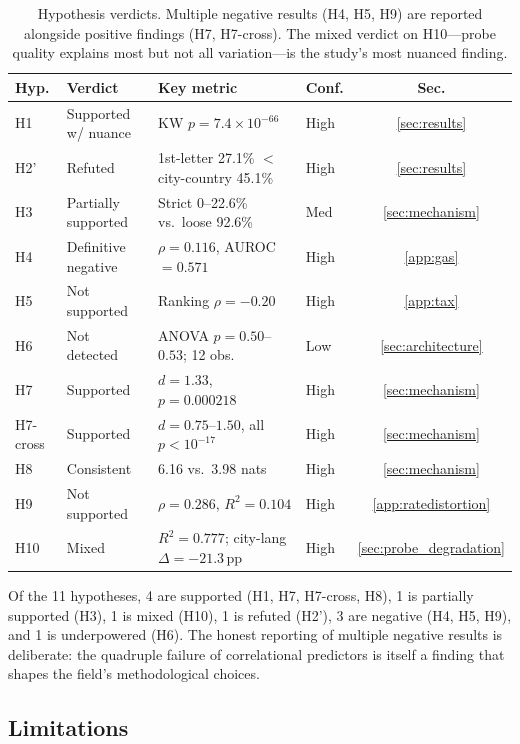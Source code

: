 \documentclass{article}
\begin{document}
\begin{table}[t]
\caption{Hypothesis verdicts. Multiple negative results (H4, H5, H9) are reported alongside positive findings (H7, H7-cross). The mixed verdict on H10---probe quality explains most but not all variation---is the study's most nuanced finding.}
\label{tab:verdicts}
\centering
\small
\begin{tabular}{llllc}
\toprule
Hyp. & Verdict & Key metric & Conf. & Sec. \\
\midrule
H1 & Supported w/ nuance & KW $p = 7.4 \times 10^{-66}$ & High & \ref{sec:results} \\
H2' & Refuted & 1st-letter 27.1\% $<$ city-country 45.1\% & High & \ref{sec:results} \\
H3 & Partially supported & Strict 0--22.6\% vs.\ loose 92.6\% & Med & \ref{sec:mechanism} \\
H4 & Definitive negative & $\rho = 0.116$, AUROC~$= 0.571$ & High & \ref{app:gas} \\
H5 & Not supported & Ranking $\rho = -0.20$ & High & \ref{app:tax} \\
H6 & Not detected & ANOVA $p = 0.50$--$0.53$; 12 obs. & Low & \ref{sec:architecture} \\
H7 & Supported & $d = 1.33$, $p = 0.000218$ & High & \ref{sec:mechanism} \\
H7-cross & Supported & $d = 0.75$--$1.50$, all $p < 10^{-17}$ & High & \ref{sec:mechanism} \\
H8 & Consistent & 6.16 vs.\ 3.98 nats & High & \ref{sec:mechanism} \\
H9 & Not supported & $\rho = 0.286$, $R^2 = 0.104$ & High & \ref{app:ratedistortion} \\
H10 & Mixed & $R^2 = 0.777$; city-lang $\Delta = -21.3$\,pp & High & \ref{sec:probe_degradation} \\
\bottomrule
\end{tabular}
\end{table}

Of the 11 hypotheses, 4 are supported (H1, H7, H7-cross, H8), 1 is partially supported (H3), 1 is mixed (H10), 1 is refuted (H2'), 3 are negative (H4, H5, H9), and 1 is underpowered (H6). The honest reporting of multiple negative results is deliberate: the quadruple failure of correlational predictors is itself a finding that shapes the field's methodological choices.

\subsection{Limitations}
\end{document}
